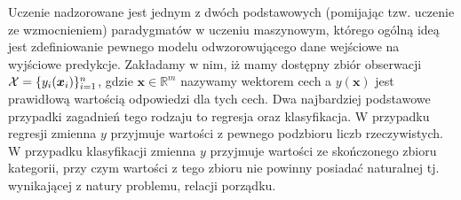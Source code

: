 \documentclass{myclass}
\numberwithin{equation}{subsection}
\begin{document}
Uczenie nadzorowane jest jednym z dwóch podstawowych (pomijając tzw. uczenie ze wzmocnieniem)
paradygmatów w uczeniu maszynowym, którego ogólną ideą jest zdefiniowanie pewnego modelu
odwzorowującego dane wejściowe na wyjściowe predykcje. Zakładamy w nim, iż mamy dostępny zbiór
obserwacji \(\mathcal{X} = \{y_i(\bm{x}_i)\}_{i=1}^n\), gdzie \(\bm{x} \in \mathbb{R}^m\) nazywamy
wektorem cech a \(y(\bm{x})\) jest prawidłową wartością odpowiedzi dla tych cech. Dwa najbardziej
podstawowe przypadki zagadnień tego rodzaju to regresja oraz klasyfikacja. W przypadku regresji
zmienna \(y\) przyjmuje wartości z pewnego podzbioru liczb rzeczywistych. W przypadku klasyfikacji
zmienna \(y\) przyjmuje wartości ze skończonego zbioru kategorii, przy czym wartości z tego zbioru
nie powinny posiadać naturalnej tj. wynikającej z natury problemu, relacji porządku.
\end{document}
